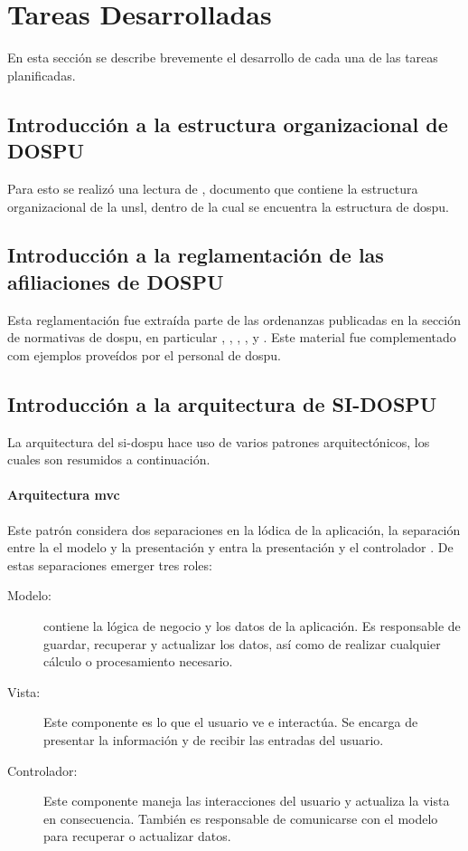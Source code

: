 \section{Tareas Desarrolladas}

En esta sección se describe brevemente el desarrollo de cada una de las tareas planificadas.

\subsection{Introducción a la estructura organizacional de DOSPU}
Para esto se realizó una lectura de \cite{CSOrd17}, documento que contiene la estructura organizacional de la \acrshort{unsl}, dentro de la cual se encuentra la estructura de \acrshort{dospu}.

\subsection{Introducción a la reglamentación de las afiliaciones de DOSPU}\label{para:afiliaciones}
Esta reglamentación fue extraída parte de las ordenanzas publicadas en la sección de normativas de \acrshort{dospu}, en particular \cite{dospuRes21}, \cite{dospuRes71}, \cite{dospuRes31}, \cite{dospuRes43}, \cite{dospuRes7} y \cite{CSOrd53}. Este material fue complementado com ejemplos proveídos por el personal de \acrshort{dospu}.

\subsection{Introducción a la arquitectura de SI-DOSPU}
La arquitectura del \acrshort{si}-\acrshort{dospu} hace uso de varios patrones arquitectónicos, los cuales son resumidos a continuación.

\paragraph{Arquitectura \acrshort{mvc}}
Este patrón considera dos separaciones en la lódica de la aplicación, la separación entre la el modelo y la presentación y entra la presentación y el controlador \cite{fowlerPatterns}. De estas separaciones emerger tres roles:

\begin{description}
    \item[Modelo:] contiene la lógica de negocio y los datos de la aplicación. Es responsable de guardar, recuperar y actualizar los datos, así como de realizar cualquier cálculo o procesamiento necesario.
    \item[Vista:] Este componente es lo que el usuario ve e interactúa. Se encarga de presentar la información y de recibir las entradas del usuario.
    \item[Controlador:] Este componente maneja las interacciones del usuario y actualiza la vista en consecuencia. También es responsable de comunicarse con el modelo para recuperar o actualizar datos.
\end{description}

